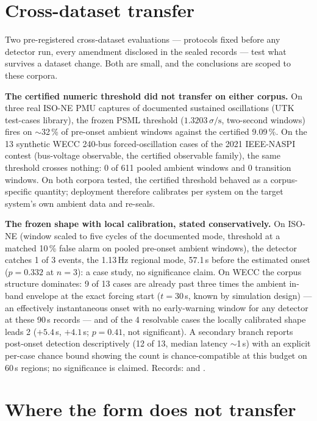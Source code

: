 \documentclass[11pt]{article}
\begin{document}
\section{Cross-dataset transfer}\label{sec:portability}

Two pre-registered cross-dataset evaluations --- protocols fixed before
any detector run, every amendment disclosed in the sealed records ---
test what survives a dataset change. Both are small, and the
conclusions are scoped to these corpora.

\textbf{The certified numeric threshold did not transfer on either
corpus.} On three real ISO-NE PMU captures of documented sustained
oscillations (UTK test-cases library), the frozen PSML threshold
($1.3203\,\sigma/\mathrm{s}$, two-second windows) fires on
$\sim$32\,\% of pre-onset ambient windows against the certified
9.09\,\%. On the 13 synthetic WECC 240-bus forced-oscillation cases of
the 2021 IEEE-NASPI contest (bus-voltage observable, the certified
observable family), the same threshold crosses nothing: 0 of 611 pooled
ambient windows and 0 transition windows. On both corpora tested, the
certified threshold behaved as a corpus-specific quantity; deployment
therefore calibrates per system on the target system's own ambient data
and re-seals.

\textbf{The frozen shape with local calibration, stated
conservatively.} On ISO-NE (window scaled to five cycles of the
documented mode, threshold at a matched 10\,\% false alarm on pooled
pre-onset ambient windows), the detector catches 1 of 3 events, the
1.13\,Hz regional mode, 57.1\,s before the estimated onset
($p = 0.332$ at $n = 3$): a case study, no significance claim. On WECC
the corpus structure dominates: 9 of 13 cases are already past three
times the ambient in-band envelope at the exact forcing start
($t = 30$\,s, known by simulation design) --- an effectively
instantaneous onset with no early-warning window for any detector at
these 90\,s records --- and of the 4 resolvable cases the locally
calibrated shape leads 2 ($+5.4$\,s, $+4.1$\,s; $p = 0.41$, not
significant). A secondary branch reports post-onset detection
descriptively (12 of 13, median latency $\sim$1\,s) with an explicit
per-case chance bound showing the count is chance-compatible at this
budget on 60\,s regions; no significance is claimed. Records:
 and
.

\section{Where the form does not transfer}\label{sec:boundaries}
\end{document}
